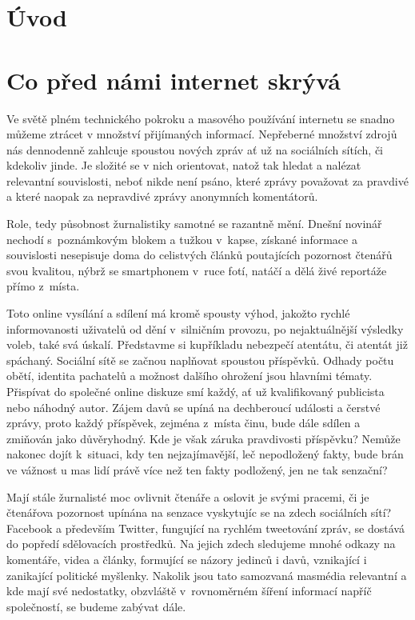 \documentclass[12pt, a4paper]{article}
\numberwithin{equation}{section} 	%
\begin{document}

\newpage
\section*{Úvod}
\noindent

\newpage
\section{Co před námi internet skrývá}
\noindent Ve světě plném technického pokroku a masového používání internetu se snadno můžeme ztrácet v množství přijímaných informací. Nepřeberné množství zdrojů nás dennodenně zahlcuje spoustou nových zpráv ať už na sociálních sítích, či kdekoliv jinde. Je složité se v nich orientovat, natož tak hledat a nalézat relevantní souvislosti, neboť nikde není psáno, které zprávy považovat za pravdivé a které naopak za nepravdivé zprávy anonymních komentátorů.

Role, tedy působnost žurnalistiky samotné se razantně mění. Dnešní novinář nechodí s poznámkovým blokem a tužkou v kapse, získané informace a souvislosti nesepisuje doma do celistvých článků poutajících pozornost čtenářů svou kvalitou, nýbrž se smartphonem v ruce fotí, natáčí a dělá živé reportáže přímo z místa.

Toto online vysílání a sdílení má kromě spousty výhod, jakožto rychlé informovanosti uživatelů od dění v silničním provozu, po nejaktuálnější výsledky voleb, také svá úskalí. Představme si kupříkladu nebezpečí atentátu, či atentát již spáchaný. Sociální sítě se začnou naplňovat spoustou příspěvků. Odhady počtu obětí, identita pachatelů a možnost dalšího ohrožení jsou hlavními tématy. Při\-spí\-vat do společné online diskuze smí každý, ať už kvalifikovaný publicista nebo náhodný autor. Zájem davů se upíná na dechberoucí události a čerstvé zprávy, proto každý příspěvek, zejména z místa činu, bude dále sdílen a zmiňován jako důvěryhodný. Kde je však záruka pravdivosti příspěvku? Nemůže nakonec dojít k situaci, kdy ten nejzajímavější, leč nepodložený fakty, bude brán ve vážnost u mas lidí právě více než ten fakty podložený, jen ne tak senzační?

Mají stále žurnalisté moc ovlivnit čtenáře a oslovit je svými pracemi, či je čtenářova pozornost upínána na senzace vyskytujíc se na zdech sociálních sítí? Facebook a především Twitter, fungující na rychlém tweetování zpráv, se dostává do popředí sdělovacích prostředků. Na jejich zdech sledujeme mnohé odkazy na komentáře, videa a články, formující se názory jedinců i davů, vznikající i zanikající politické myšlenky. Nakolik jsou tato samozvaná masmédia relevantní a kde mají své nedostatky, obzvláště v rovnoměrném šíření informací napříč společností, se budeme zabývat dále.
\end{document}
